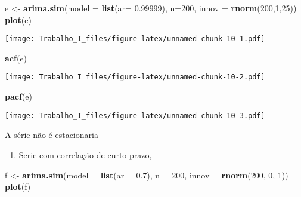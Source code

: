 \documentclass[]{article}
\newenvironment{Shaded}{\begin{snugshade}}{\end{snugshade}}
\newcommand{\KeywordTok}[1]{\textcolor[rgb]{0.13,0.29,0.53}{\textbf{#1}}}
\newcommand{\DataTypeTok}[1]{\textcolor[rgb]{0.13,0.29,0.53}{#1}}
\newcommand{\DecValTok}[1]{\textcolor[rgb]{0.00,0.00,0.81}{#1}}
\newcommand{\FloatTok}[1]{\textcolor[rgb]{0.00,0.00,0.81}{#1}}
\newcommand{\StringTok}[1]{\textcolor[rgb]{0.31,0.60,0.02}{#1}}
\newcommand{\NormalTok}[1]{#1}
\providecommand{\tightlist}{%
  \setlength{\itemsep}{0pt}\setlength{\parskip}{0pt}}
\begin{document}
\begin{Shaded}
\begin{Highlighting}[]
\NormalTok{e <-}\StringTok{ }\KeywordTok{arima.sim}\NormalTok{(}\DataTypeTok{model =} \KeywordTok{list}\NormalTok{(}\DataTypeTok{ar=} \FloatTok{0.99999}\NormalTok{), }\DataTypeTok{n=}\DecValTok{200}\NormalTok{, }\DataTypeTok{innov =} \KeywordTok{rnorm}\NormalTok{(}\DecValTok{200}\NormalTok{,}\DecValTok{1}\NormalTok{,}\DecValTok{25}\NormalTok{))}
\KeywordTok{plot}\NormalTok{(e)}
\end{Highlighting}
\end{Shaded}

\texttt{[image: Trabalho\_I\_files/figure-latex/unnamed-chunk-10-1.pdf]}

\begin{Shaded}
\begin{Highlighting}[]
\KeywordTok{acf}\NormalTok{(e)}
\end{Highlighting}
\end{Shaded}

\texttt{[image: Trabalho\_I\_files/figure-latex/unnamed-chunk-10-2.pdf]}

\begin{Shaded}
\begin{Highlighting}[]
\KeywordTok{pacf}\NormalTok{(e)}
\end{Highlighting}
\end{Shaded}

\texttt{[image: Trabalho\_I\_files/figure-latex/unnamed-chunk-10-3.pdf]}

A série não é estacionaria

\begin{enumerate}
\def\labelenumi{\alph{enumi})}
\setcounter{enumi}{5}
\tightlist
\item
  Serie com correlação de curto-prazo,
\end{enumerate}

\begin{Shaded}
\begin{Highlighting}[]
\NormalTok{f <-}\StringTok{ }\KeywordTok{arima.sim}\NormalTok{(}\DataTypeTok{model =} \KeywordTok{list}\NormalTok{(}\DataTypeTok{ar =} \FloatTok{0.7}\NormalTok{), }\DataTypeTok{n =} \DecValTok{200}\NormalTok{, }\DataTypeTok{innov =} \KeywordTok{rnorm}\NormalTok{(}\DecValTok{200}\NormalTok{, }\DecValTok{0}\NormalTok{, }\DecValTok{1}\NormalTok{))}
\KeywordTok{plot}\NormalTok{(f)}
\end{Highlighting}
\end{Shaded}
\end{document}
